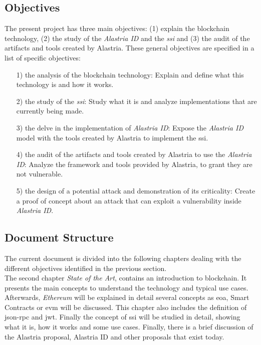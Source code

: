 \documentclass[a4paper, 12pt]{article} %
\begin{document}
        \subsection{Objectives}
            The present project has three main objectives: (1) explain the blockchain technology, (2) the study of the \textit{Alastria ID} and the \textit{\acrlong{ssi}} and (3) the audit of the artifacts and tools created by Alastria. These general objectives are specified in a list of specific objectives:
            \begin{itemize} 
                \item[1)] the analysis of the blockchain technology: Explain and define what this technology is and how it works.
                \item[2)] the study of the \textit{\acrlong{ssi}}: Study what it is and analyze implementations that are currently being made.
                \item[3)] the delve in the implementation of \textit{Alastria ID}: Expose the \textit{Alastria ID} model with the tools created by Alastria to implement the \acrlong{ssi}.
                \item[4)] the audit of the artifacts and tools created by Alastria to use the \textit{Alastria ID}: Analyze the framework and tools provided by Alastria, to grant they are not vulnerable.
                \item[5)] the design of a potential attack and demonstration of its criticality: Create a proof of concept about an attack that can exploit a vulnerability inside \textit{Alastria ID}.
            \end{itemize}
            
        \subsection{Document Structure}
            The current document is divided into the following chapters dealing with the different objectives identified in the previous section.\\
            
            The second chapter \textit{State of the Art}, contains an introduction to blockchain. It presents the main concepts to understand the technology and typical use cases. Afterwards, \textit{Ethereum} will be explained in detail several concepts as \acrlong{eoa}, Smart Contracts or \acrlong{evm} will be discussed. This chapter also includes the definition of \acrshort{json}-\acrshort{rpc} and \acrfull{jwt}. Finally the concept of \acrlong{ssi} will be studied in detail, showing what it is, how it works and some use cases. Finally, there is a brief discussion of the Alastria proposal, Alastria ID and other proposals that exist today.\\
            
\end{document}
